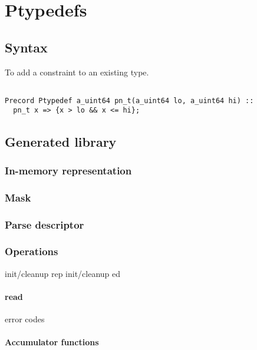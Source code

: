 \chapter{Ptypedefs}
\label{chap:typedef}
\section{Syntax}
To add a constraint to an existing type.
\begin{verbatim}

Precord Ptypedef a_uint64 pn_t(a_uint64 lo, a_uint64 hi) :: 
  pn_t x => {x > lo && x <= hi};

\end{verbatim}


\section{Generated library}
\subsection{In-memory representation}
\label{sec:typedefs-rep}
\subsection{Mask}
\label{sec:typedefs-masks}
\subsection{Parse descriptor}
\label{sec:typedefs-parse-descriptors}
\subsection{Operations}
init/cleanup rep
init/cleanup ed
\subsubsection{read}
  error codes
\subsubsection{Accumulator functions}

